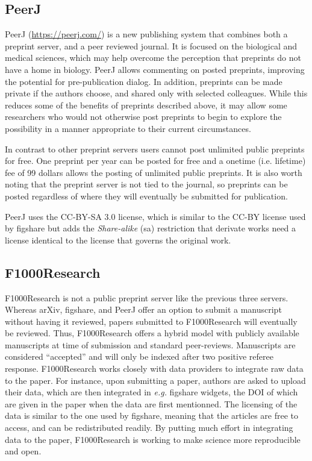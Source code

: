 \documentclass[letterpaper,twocolumn,superscriptaddress,showkeys,longbibliography]{revtex4-1}
\begin{document}
\subsection{PeerJ}

PeerJ (\href{https://peerj.com/}{https://peerj.com/}) is a new publishing system
that combines both a preprint server, and a peer reviewed journal.  It is
focused on the biological and medical sciences, which may help overcome the
perception that preprints do not have a home in biology.  PeerJ allows
commenting on posted preprints, improving the potential for pre-publication
dialog. In addition, preprints can be made private if the authors choose, and
shared only with selected colleagues. While this reduces some of the benefits of
preprints described above, it may allow some researchers who would not otherwise
post preprints to begin to explore the possibility in a manner appropriate to
their current circumstances.

In contrast to other preprint servers users cannot post unlimited public
preprints for free. One preprint per year can be posted for free and a onetime
(i.e. lifetime) fee of 99 dollars allows the posting of unlimited public
preprints. It is also worth noting that the preprint server is not tied to the
journal, so preprints can be posted regardless of where they will eventually be
submitted for publication.

PeerJ uses the CC-BY-SA 3.0 license, which is similar to the CC-BY license used
by figshare but adds the \emph{Share-alike} (sa) restriction that derivate works
need a license identical to the license that governs the original work.

\subsection{F1000Research}

F1000Research is not a public preprint server like the previous three servers.
Whereas arXiv, figshare, and PeerJ offer an option to submit a manuscript
without having it reviewed, papers submitted to F1000Research will eventually be
reviewed. Thus, F1000Research offers a hybrid model with publicly available
manuscripts at time of submission and standard peer-reviews. Manuscripts are
considered ``accepted'' and will only be indexed after two positive referee
response. F1000Research works closely with data providers to integrate raw data
to the paper. For instance, upon submitting a paper, authors are asked to upload
their data, which are then integrated in \emph{e.g.} figshare widgets, the DOI
of which are given in the paper when the data are first mentionned.  The
licensing of the data is similar to the one used by figshare, meaning that the
articles are free to access, and can be redistributed readily. By putting much
effort in integrating data to the paper, F1000Research is working to make
science more reproducible and open.
\end{document}
